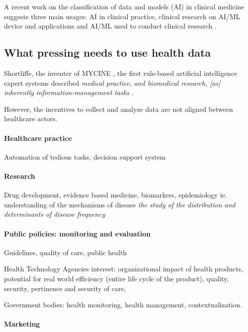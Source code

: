 \documentclass[french,12pt,twoside,a4paper]{book}
\begin{document}
A recent work on the classification of data and models (AI) in clinical medicine
suggests three main usages: AI in clinical practice, clinical research on AI/ML
device and applications and AI/ML used to conduct clinical research
\citep{haug2023artificial}.

\subsection{What pressing needs to use health data}

Shortliffe, the inventer of MYCINE \citep{shortliffe1974mycin}, the first
rule-based artificial intelligence expert systems described \textit{medical
  practice, and biomedical research, [as] inherently information-management tasks}
\citep{patel2009coming}.

However, the incentives to collect and analyze data are not aligned between
healthcare actors.

\paragraph{Healthcare practice}

Automation of tedious tasks, decision support system

\paragraph{Research}

Drug development, evidence based medicine, biomarkers, epidemiology ie.
understanding of the mechanisms of disease \textit{the study of the distribution
  and determinants of disease frequency} \citep{macmahon1970epidemiology}

\paragraph{Public policies: monitoring and evaluation}

Guidelines, quality of care, public health

Health Technology Agencies interest: organizational impact of health products,
potential for real world efficiency (entire life cycle of the product), quality,
security, pertinence and security of care,

Government bodies: health monitoring, health management, contextualization.

\paragraph{Marketing}
\end{document}

